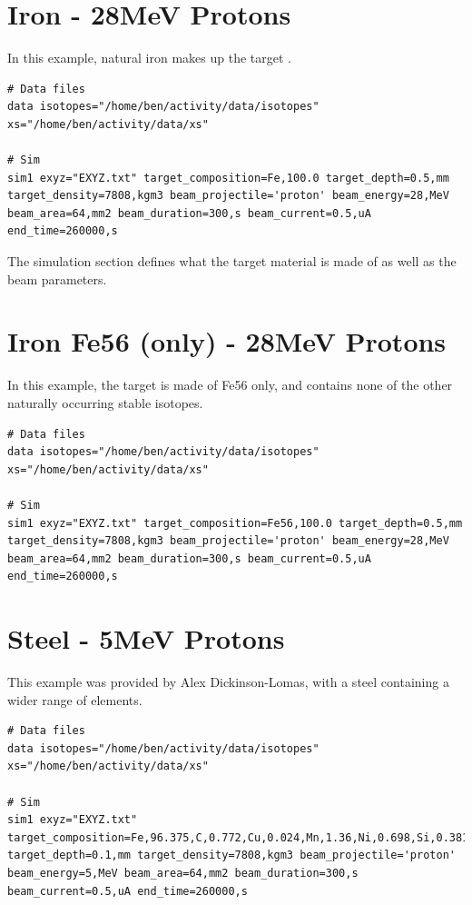 \documentclass[12pt,twoside]{manual}
\begin{document}
\section{Iron - 28MeV Protons}

In this example, natural iron makes up the target . 

\begin{lstlisting}[style=inputfile, caption={}]
# Data files
data isotopes="/home/ben/activity/data/isotopes" xs="/home/ben/activity/data/xs"

# Sim
sim1 exyz="EXYZ.txt" target_composition=Fe,100.0 target_depth=0.5,mm target_density=7808,kgm3 beam_projectile='proton' beam_energy=28,MeV beam_area=64,mm2 beam_duration=300,s beam_current=0.5,uA end_time=260000,s
\end{lstlisting}

The simulation section defines what the target material is made of as well as the beam parameters.  



\section{Iron Fe56 (only) - 28MeV Protons}

In this example, the target is made of Fe56 only, and contains none of the other naturally occurring stable isotopes.

\begin{lstlisting}[style=inputfile, caption={}]
# Data files
data isotopes="/home/ben/activity/data/isotopes" xs="/home/ben/activity/data/xs"

# Sim
sim1 exyz="EXYZ.txt" target_composition=Fe56,100.0 target_depth=0.5,mm target_density=7808,kgm3 beam_projectile='proton' beam_energy=28,MeV beam_area=64,mm2 beam_duration=300,s beam_current=0.5,uA end_time=260000,s
\end{lstlisting}



\section{Steel - 5MeV Protons}

This example was provided by Alex Dickinson-Lomas, with a steel containing a wider range of elements.

\begin{lstlisting}[style=inputfile, caption={}]
# Data files
data isotopes="/home/ben/activity/data/isotopes" xs="/home/ben/activity/data/xs"

# Sim
sim1 exyz="EXYZ.txt" target_composition=Fe,96.375,C,0.772,Cu,0.024,Mn,1.36,Ni,0.698,Si,0.381,Cr,0.092,V,0.008,P,0.009,Si,0.003,Mo,0.278 target_depth=0.1,mm target_density=7808,kgm3 beam_projectile='proton' beam_energy=5,MeV beam_area=64,mm2 beam_duration=300,s beam_current=0.5,uA end_time=260000,s
\end{lstlisting}
\end{document}
